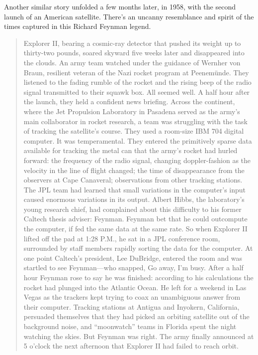 Another similar story unfolded a few months later, in 1958, with the second launch of an American satellite. There’s an uncanny resemblance and spirit of the times captured in this Richard Feynman legend.

\begin{quotation}
Explorer II, bearing a cosmic-ray detector that pushed its weight up to thirty-two pounds, soared skyward five weeks later and disappeared into the clouds. An army team watched under the guidance of Wernher von Braun, resilient veteran of the Nazi rocket program at Peenemünde. They listened to the fading rumble of the rocket and the rising beep of the radio signal transmitted to their squawk box. All seemed well. A half hour after the launch, they held a confident news briefing. Across the continent, where the Jet Propulsion Laboratory in Pasadena served as the army’s main collaborator in rocket research, a team was struggling with the task of tracking the satellite’s course. They used a room-size IBM 704 digital computer. It was temperamental. They entered the primitively sparse data available for tracking the metal can that the army’s rocket had hurled forward: the frequency of the radio signal, changing doppler-fashion as the velocity in the line of flight changed; the time of disappearance from the observers at Cape Canaveral; observations from other tracking stations. The JPL team had learned that small variations in the computer’s input caused enormous variations in its output. Albert Hibbs, the laboratory’s young research chief, had complained about this difficulty to his former Caltech thesis adviser: Feynman. Feynman bet that he could outcompute the computer, if fed the same data at the same rate. So when Explorer II lifted off the pad at 1:28 P.M., he sat in a JPL conference room, surrounded by staff members rapidly sorting the data for the computer. At one point Caltech’s president, Lee DuBridge, entered the room and was startled to see Feynman—who snapped, Go away, I’m busy. After a half hour Feynman rose to say he was finished: according to his calculations the rocket had plunged into the Atlantic Ocean. He left for a weekend in Las Vegas as the trackers kept trying to coax an unambiguous answer from their computer. Tracking stations at Antigua and Inyokern, California, persuaded themselves that they had picked an orbiting satellite out of the background noise, and “moonwatch” teams in Florida spent the night watching the skies. But Feynman was right. The army finally announced at 5 o’clock the next afternoon that Explorer II had failed to reach orbit.
\end{quotation}

